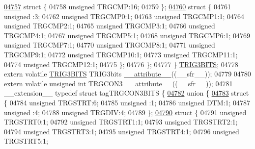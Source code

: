 \begin{DoxyCode}
\hypertarget{a00009_source_l04757}{}\hyperlink{a00009}{04757}     \textcolor{keyword}{struct }\{
04758       \textcolor{keywordtype}{unsigned} TRGCMP:16;
04759     \};
\hypertarget{a00009_source_l04760}{}\hyperlink{a00009}{04760}     \textcolor{keyword}{struct }\{
04761       \textcolor{keywordtype}{unsigned} :3;
04762       \textcolor{keywordtype}{unsigned} TRGCMP0:1;
04763       \textcolor{keywordtype}{unsigned} TRGCMP1:1;
04764       \textcolor{keywordtype}{unsigned} TRGCMP2:1;
04765       \textcolor{keywordtype}{unsigned} TRGCMP3:1;
04766       \textcolor{keywordtype}{unsigned} TRGCMP4:1;
04767       \textcolor{keywordtype}{unsigned} TRGCMP5:1;
04768       \textcolor{keywordtype}{unsigned} TRGCMP6:1;
04769       \textcolor{keywordtype}{unsigned} TRGCMP7:1;
04770       \textcolor{keywordtype}{unsigned} TRGCMP8:1;
04771       \textcolor{keywordtype}{unsigned} TRGCMP9:1;
04772       \textcolor{keywordtype}{unsigned} TRGCMP10:1;
04773       \textcolor{keywordtype}{unsigned} TRGCMP11:1;
04774       \textcolor{keywordtype}{unsigned} TRGCMP12:1;
04775     \};
04776   \};
04777 \} \hyperlink{a00008_d7/d4f/a00819}{TRIG3BITS};
04778 \textcolor{keyword}{extern} \textcolor{keyword}{volatile} \hyperlink{a00008_d7/d4f/a00819}{TRIG3BITS} TRIG3bits \hyperlink{a00009_a493c46f03454991ccc5aa7a6e1dfb2a7}{\_\_attribute\_\_}((\_\_sfr\_\_));
04779 
04780 \textcolor{keyword}{extern} \textcolor{keyword}{volatile} \textcolor{keywordtype}{unsigned} \textcolor{keywordtype}{int}  TRGCON3 \hyperlink{a00009_a493c46f03454991ccc5aa7a6e1dfb2a7}{\_\_attribute\_\_}((\_\_sfr\_\_));
\hypertarget{a00009_source_l04781}{}\hyperlink{a00008}{04781} \_\_extension\_\_ \textcolor{keyword}{typedef} \textcolor{keyword}{struct }tagTRGCON3BITS \{
\hypertarget{a00009_source_l04782}{}\hyperlink{a00009}{04782}   \textcolor{keyword}{union }\{
\hypertarget{a00009_source_l04783}{}\hyperlink{a00009}{04783}     \textcolor{keyword}{struct }\{
04784       \textcolor{keywordtype}{unsigned} TRGSTRT:6;
04785       \textcolor{keywordtype}{unsigned} :1;
04786       \textcolor{keywordtype}{unsigned} DTM:1;
04787       \textcolor{keywordtype}{unsigned} :4;
04788       \textcolor{keywordtype}{unsigned} TRGDIV:4;
04789     \};
\hypertarget{a00009_source_l04790}{}\hyperlink{a00009}{04790}     \textcolor{keyword}{struct }\{
04791       \textcolor{keywordtype}{unsigned} TRGSTRT0:1;
04792       \textcolor{keywordtype}{unsigned} TRGSTRT1:1;
04793       \textcolor{keywordtype}{unsigned} TRGSTRT2:1;
04794       \textcolor{keywordtype}{unsigned} TRGSTRT3:1;
04795       \textcolor{keywordtype}{unsigned} TRGSTRT4:1;
04796       \textcolor{keywordtype}{unsigned} TRGSTRT5:1;

\end{DoxyCode}
